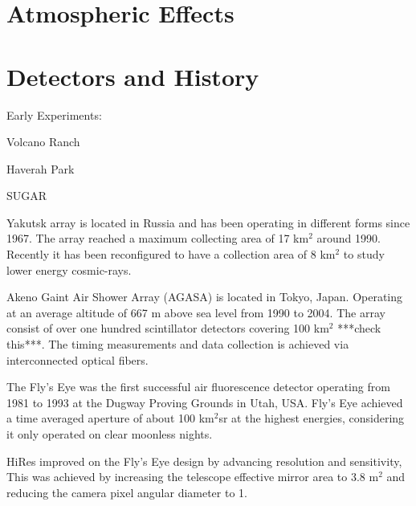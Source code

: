 \section{Atmospheric Effects}




\section{Detectors and History}

Early Experiments:

Volcano Ranch

Haverah Park

SUGAR

Yakutsk array is located in Russia and has been operating in different forms since 1967. The array reached a maximum collecting area of 17 km$^2$ around 1990. Recently it has been reconfigured to have a collection area of 8 km$^2$ to study lower energy cosmic-rays.

Akeno Gaint Air Shower Array (AGASA) is located in Tokyo, Japan. Operating at an average altitude of 667 m above sea level from 1990 to 2004. The array consist of over one hundred scintillator detectors covering 100 km$^2$ ***check this***. The timing measurements and data collection is achieved via interconnected optical fibers.

The Fly's Eye was the first successful air fluorescence detector operating from 1981 to 1993 at the Dugway Proving Grounds in Utah, USA. Fly's Eye achieved a time averaged aperture of about 100 km$^2$sr at the highest energies, considering it only operated on clear moonless nights. 

HiRes improved on the Fly's Eye design by advancing resolution and sensitivity, This was achieved by increasing the telescope effective mirror area to 3.8 m$^2$ and reducing the camera pixel angular diameter to 1\textdegree.